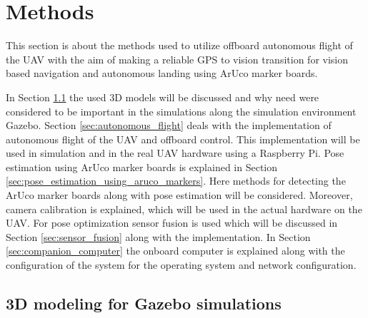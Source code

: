 \documentclass[../Head/report.tex]{subfiles}
\begin{document}


\lstset{style=mystyle}

\section{Methods}
\label{sec:methods}

This section is about the methods used to utilize offboard autonomous flight of the UAV with the aim of making a reliable GPS to vision transition for vision based navigation and autonomous landing using ArUco marker boards.  

In Section \ref{sec:3d_modeling_for_gazebo_simulations} the used 3D models will be discussed and why need were considered to be important in the simulations along the simulation environment Gazebo.  Section \ref{sec:autonomous_flight} deals with the implementation of autonomous flight of the UAV and offboard control. This implementation will be used in simulation and in the real UAV hardware using a Raspberry Pi. Pose estimation using ArUco marker boards is explained in Section \ref{sec:pose_estimation_using_aruco_markers}. Here methods for detecting the ArUco marker boards along with pose estimation will be considered. Moreover, camera calibration is explained, which will be used in the actual hardware on the UAV. For pose optimization sensor fusion is used which will be discussed in Section \ref{sec:sensor_fusion} along with the implementation. In Section \ref{sec:companion_computer} the onboard computer is explained along with the configuration of the system for the operating system and network configuration. 

\subsection{3D modeling for Gazebo simulations}
\label{sec:3d_modeling_for_gazebo_simulations}
\end{document}
